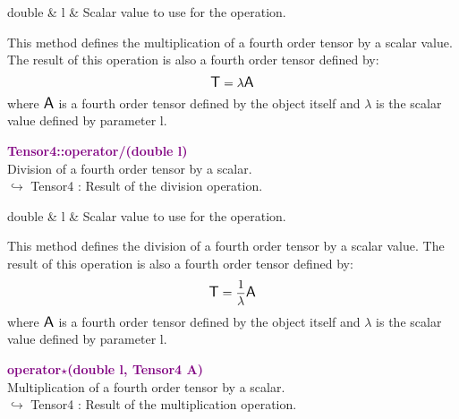 \begin{tcolorbox}[width=\textwidth,myArgs,tabularx={ll|R}]
double & l & Scalar value to use for the operation.
\end{tcolorbox}

This method defines the multiplication of a fourth order tensor by a scalar value.
The result of this operation is also a fourth order tensor defined by:
\begin{equation*}
\mbox{\large\ensuremath{\mathsf{T}}} = \lambda \mbox{\large\ensuremath{\mathsf{A}}}
\end{equation*}
where $\mbox{\large\ensuremath{\mathsf{A}}}$ is a fourth order tensor defined by the object itself and $\lambda$ is the scalar value defined by parameter l.

\textcolor{purple}{\textbf{Tensor4::operator/(double l)}}\label{Tensor4::operator/(double l)}\\
Division of a fourth order tensor by a scalar.\\ \hspace*{10mm}$\hookrightarrow$ Tensor4 : Result of the division operation.

\begin{tcolorbox}[width=\textwidth,myArgs,tabularx={ll|R}]
double & l & Scalar value to use for the operation.
\end{tcolorbox}

This method defines the division of a fourth order tensor by a scalar value.
The result of this operation is also a fourth order tensor defined by:
\begin{equation*}
\mbox{\large\ensuremath{\mathsf{T}}} = \frac{1}{\lambda} \mbox{\large\ensuremath{\mathsf{A}}}
\end{equation*}
where $\mbox{\large\ensuremath{\mathsf{A}}}$ is a fourth order tensor defined by the object itself and $\lambda$ is the scalar value defined by parameter l.

\textcolor{purple}{\textbf{operator$\star$(double l, Tensor4 A)}}\label{operator*(double l, Tensor4 A)}\\
Multiplication of a fourth order tensor by a scalar.\\ \hspace*{10mm}$\hookrightarrow$ Tensor4 : Result of the multiplication operation.

